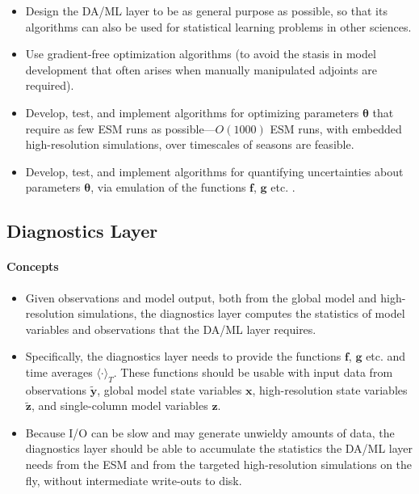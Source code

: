\documentclass{article}
\renewcommand{\vec}[1]{\boldsymbol{{#1}}}
\begin{document}
\begin{itemize}
    \item Design the DA/ML layer to be as general purpose as possible, so that its algorithms can also be used for statistical learning problems in other sciences.
    \item Use gradient-free optimization algorithms (to avoid the stasis in model development that often arises when manually manipulated adjoints are required).
    \item Develop, test, and implement algorithms for optimizing parameters $\vec{\theta}$ that require as few ESM runs as possible---$O(1000)$ ESM runs, with embedded high-resolution simulations, over timescales of seasons are feasible. 
    \item Develop, test, and implement algorithms for quantifying uncertainties about parameters $\vec{\theta}$, via emulation of the functions $\vec{f}$, $\vec{g}$ etc. \citep{Kennedy01a,OHagan06a}.
\end{itemize}

\subsection{Diagnostics Layer}

\paragraph{Concepts}

\begin{itemize}
    \item  Given observations and model output, both from the global model and high-resolution simulations, the diagnostics layer computes the statistics of model variables and observations that the DA/ML layer requires.
    \item Specifically, the diagnostics layer needs to provide the functions $\vec{f}$, $\vec{g}$ etc. and time averages $\langle \cdot \rangle_T$. These functions should be usable with input data from observations $\vec{\tilde y}$, global model state variables $\vec{x}$, high-resolution state variables $\vec{\tilde z}$, and single-column model variables $\vec{z}$.
    \item Because I/O can be slow and may generate unwieldy amounts of data, the diagnostics layer should be able to accumulate the statistics the DA/ML layer needs from the ESM and from the targeted high-resolution simulations on the fly, without intermediate write-outs to disk.
\end{itemize}
\end{document}
